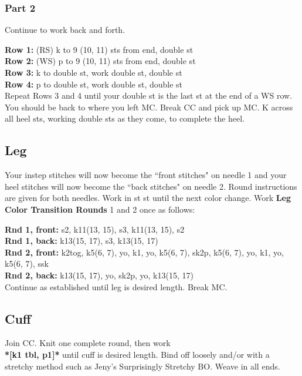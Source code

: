 \documentclass[12pt]{article}
\newcommand{\rowDir}[1]{\textbf{#1:}} %
\renewcommand{\repeat}[1]{\textbf{*[#1]*}} %
\begin{document}
\begin{multicols}{2}
\subsubsection*{Part 2}

Continue to work back and forth.

\small
\rowDir{Row 1} (RS) k to 9 (10, 11) sts from end, double st \\
\rowDir{Row 2} (WS) p to 9 (10, 11) sts from end, double st \\
\rowDir{Row 3} k to double st, work double st, double st \\
\rowDir{Row 4} p to double st, work double st, double st \\

\normalsize
Repeat Rows 3 and 4 until your double st is the last st at the end of a WS row. You should be back to where you left MC. Break CC and pick up MC. K across all heel sts, working double sts as they come, to complete the heel.

\newpage

\subsection*{Leg}

Your instep stitches will now become the ``front stitches" on needle 1 and your heel stitches will now become the ``back stitches" on needle 2. Round instructions are given for both needles. Work in st st until the next color change. Work \textbf{Leg Color Transition Rounds} 1 and 2 once as follows:

\rowDir{Rnd 1, front} s2, k11(13, 15), s3, k11(13, 15), s2 \\
\rowDir{Rnd 1, back} k13(15, 17), s3, k13(15, 17) \\
\rowDir{Rnd 2, front}  k2tog, k5(6, 7), yo, k1, yo, k5(6, 7), sk2p, k5(6, 7), yo, k1, yo, k5(6, 7), ssk \\
\rowDir{Rnd 2, back} k13(15, 17), yo, sk2p, yo, k13(15, 17) \\

Continue as established until leg is desired length. Break MC.

\subsection*{Cuff}

Join CC. Knit one complete round, then work \\ \repeat{k1 tbl, p1} until cuff is desired length. Bind off loosely and/or with a stretchy method such as Jeny's Surprisingly Stretchy BO. Weave in all ends.


\end{multicols}
\end{document}
